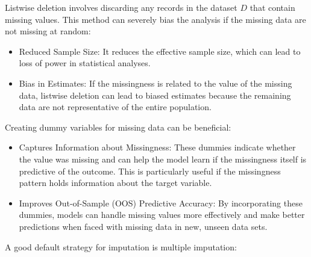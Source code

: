 \documentclass[12pt]{article}
\begin{document}
\begin{enumerate}


Listwise deletion involves discarding any records in the dataset \(D\) that contain missing values. This method can severely bias the analysis if the missing data are not missing at random:

\begin{itemize}
\item Reduced Sample Size: It reduces the effective sample size, which can lead to loss of power in statistical analyses.
\item Bias in Estimates: If the missingness is related to the value of the missing data, listwise deletion can lead to biased estimates because the remaining data are not representative of the entire population.
\end{itemize}



Creating dummy variables for missing data can be beneficial:

\begin{itemize}
\item Captures Information about Missingness: These dummies indicate whether the value was missing and can help the model learn if the missingness itself is predictive of the outcome. This is particularly useful if the missingness pattern holds information about the target variable.
\item Improves Out-of-Sample (OOS) Predictive Accuracy: By incorporating these dummies, models can handle missing values more effectively and make better predictions when faced with missing data in new, unseen data sets.
\end{itemize}



A good default strategy for imputation is multiple imputation:


\end{enumerate}
\end{document}
